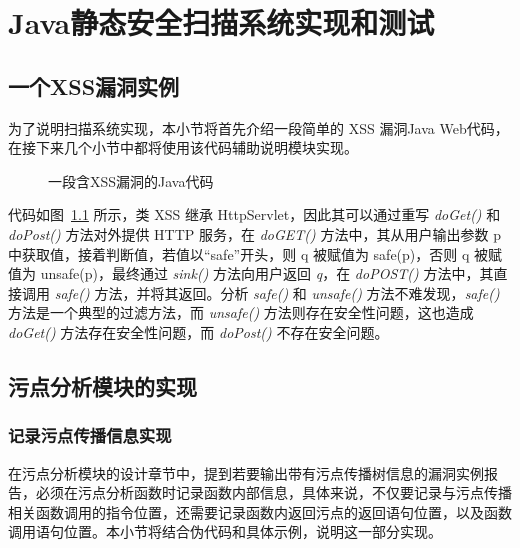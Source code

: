 \chapter{Java静态安全扫描系统实现和测试}
\section{一个XSS漏洞实例}
为了说明扫描系统实现，本小节将首先介绍一段简单的 XSS 漏洞Java Web代码，在接下来几个小节中都将使用该代码辅助说明模块实现。

\begin{figure}[!htbp]
    \noindent
    \centering
    \begin{minipage}[!htbp]{0.9\textwidth}
        
    \end{minipage}
    \caption{一段含XSS漏洞的Java代码}\label{code:xss}
\end{figure}

代码如图~\ref{code:xss} 所示，类 XSS 继承 HttpServlet，因此其可以通过重写 \textit{doGet()} 和 \textit{doPost()} 方法对外提供 HTTP 服务，在 \textit{doGET()} 方法中，其从用户输出参数 p 中获取值，接着判断值，若值以“safe”开头，则 q 被赋值为 safe(p)，否则 q 被赋值为 unsafe(p)，最终通过 \textit{sink()} 方法向用户返回 \textit{q}，在 \textit{doPOST()} 方法中，其直接调用 \textit{safe()} 方法，并将其返回。分析 \textit{safe()} 和 \textit{unsafe()} 方法不难发现，\textit{safe()} 方法是一个典型的过滤方法，而 \textit{unsafe()} 方法则存在安全性问题，这也造成 \textit{doGet()} 方法存在安全性问题，而 \textit{doPost()} 不存在安全问题。

\section{污点分析模块的实现}\label{sec:taintImp}
\subsection{记录污点传播信息实现}
在污点分析模块的设计章节中，提到若要输出带有污点传播树信息的漏洞实例报告，必须在污点分析函数时记录函数内部信息，具体来说，不仅要记录与污点传播相关函数调用的指令位置，还需要记录函数内返回污点的返回语句位置，以及函数调用语句位置。本小节将结合伪代码和具体示例，说明这一部分实现。

